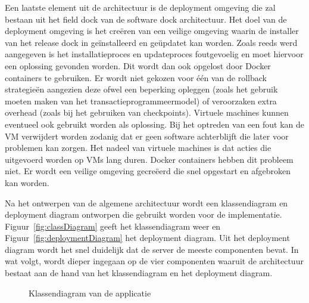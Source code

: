Een laatste element uit de architectuur is de deployment omgeving die zal bestaan uit het field dock van de software dock architectuur.
Het doel van de deployment omgeving is het creëren van een veilige omgeving waarin de installer van het release dock in geïnstalleerd en geüpdatet kan worden.
Zoals reeds werd aangegeven is het installatieproces en updateproces foutgevoelig en moet hiervoor een oplossing gevonden worden.
Dit wordt dan ook opgelost door Docker containers te gebruiken.
Er wordt niet gekozen voor één van de rollback strategieën aangezien deze ofwel een beperking opleggen (zoals het gebruik moeten maken van het transactieprogrammeermodel) of veroorzaken extra overhead (zoals bij het gebruiken van checkpoints).
Virtuele machines kunnen eventueel ook gebruikt worden als oplossing.
Bij het optreden van een fout kan de VM verwijdert worden zodanig dat er geen software achterblijft die later voor problemen kan zorgen.
Het nadeel van virtuele machines is dat acties die uitgevoerd worden op VMs lang duren.
Docker containers hebben dit probleem niet.
Er wordt een veilige omgeving gecreëerd die snel opgestart en afgebroken kan worden.

Na het ontwerpen van de algemene architectuur wordt een klassendiagram en deployment diagram ontworpen die gebruikt worden voor de implementatie.
Figuur~\vref{fig:classDiagram} geeft het klassendiagram weer en Figuur~\vref{fig:deploymentDiagram} het deployment diagram.
Uit het deployment diagram wordt het snel duidelijk dat de server de meeste componenten bevat.
In wat volgt, wordt dieper ingegaan op de vier componenten waaruit de architectuur bestaat aan de hand van het klassendiagram en het deployment diagram.

\begin{figure}[!ht]
\centering
{}
\caption{Klassendiagram van de applicatie}
\label{fig:classDiagram}
\end{figure}

